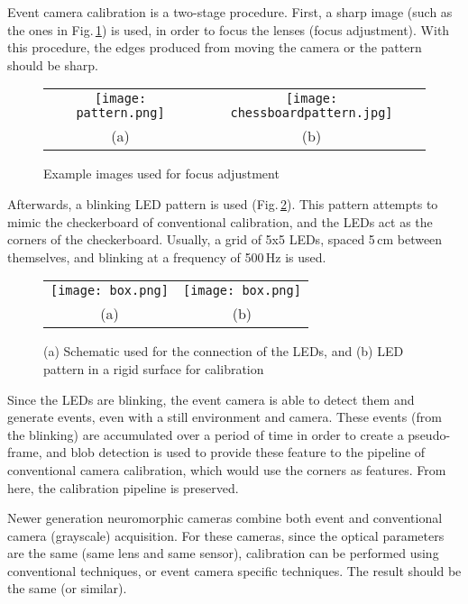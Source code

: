 Event camera calibration is a two-stage procedure. First, a sharp image (such as the ones in Fig.\,\ref{fig:sec2_calibration_patterns}) is used, in order to focus the lenses (focus adjustment). With this procedure, the edges produced from moving the camera or the pattern should be sharp. 

\begin{figure}[ht]
	\centering
		\begin{tabular}{cc}
		   \texttt{[image: pattern.png]} &
		   \hspace{1cm} \texttt{[image: chessboardpattern.jpg]} \\
		   (a) & (b)  \\
		\end{tabular}
	\caption{Example images used for focus adjustment}
	\label{fig:sec2_calibration_patterns}
\end{figure}




Afterwards, a blinking LED pattern is used (Fig.\,\ref{fig:sec2_blinking}). This pattern attempts to mimic the checkerboard of conventional calibration, and the LEDs act as the corners of the checkerboard. Usually, a grid of 5x5 LEDs, spaced 5\,cm between themselves, and blinking at a frequency of 500\,Hz is used. 


\begin{figure}[ht]
	\centering
		\begin{tabular}{cc}
		   \texttt{[image: box.png]} &
		   \hspace{1cm} \texttt{[image: box.png]} \\
		   (a) & (b)  \\
		\end{tabular}
	\caption[Setup for event camera calibration]{(a) Schematic used for the connection of the LEDs, and (b) LED pattern in a rigid surface for calibration}
	\label{fig:sec2_blinking}
\end{figure}


Since the LEDs are blinking, the event camera is able to detect them and generate events, even with a still environment and camera. These events (from the blinking) are accumulated over a period of time in order to create a pseudo-frame, and blob detection is used to provide these feature to the pipeline of conventional camera calibration, which would use the corners as features. From here, the calibration pipeline is preserved.

Newer generation neuromorphic cameras combine both event and conventional camera (grayscale) acquisition. For these cameras, since the optical parameters are the same (same lens and same sensor), calibration can be performed using conventional techniques, or event camera specific techniques. The result should be the same (or similar).

